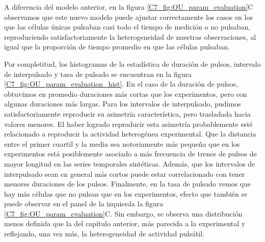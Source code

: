 \documentclass[./main.tex]{subfiles}
\begin{document}
A diferencia del modelo anterior, en la figura \ref{C7_fig:OU_param_evaluation}C observamos que este nuevo modelo puede ajustar correctamente los casos en los que las células únicas pulsaban casi todo el tiempo de medición o no pulsaban, reproduciendo satisfactoriamente la heterogeneidad de nuestras observaciones, al igual que la proporción de tiempo promedio en que las células pulsaban.


Por completitud, los histogramas de la estadística de duración de pulsos, intervalo de interpulsado y tasa de pulsado se encuentran en la figura \ref{C7_fig:OU_param_evaluation_hist}. En el caso de la duración de pulsos, obtuvimos en promedio duraciones más cortas que los experimentos, pero con algunas duraciones más largas. Para los intervalos de interpulsado, pudimos satisfactoriamente reproducir su asimetría característica, pero trasladada hacia valores menores. El haber logrado reproducir esta asimetría probablemente esté relacionado a reproducir la actividad heterogénea experimental. Que la distancia entre el primer cuartil y la media sea notoriamente más pequeña que en los experimentos está posiblemente asociado a más frecuencia de trenes de pulsos de mayor longitud en las series temporales sintéticas. Además, que los intervalos de interpulsado sean en general más cortos puede estar correlacionado con tener menores duraciones de los pulsos. Finalmente, en la tasa de pulsado vemos que hay más células que no pulsan que en los experimentos, efecto que también se puede observar en el panel de la izquierda la figura \ref{C7_fig:OU_param_evaluation}C. Sin embargo, se observa una distribución menos definida que la del capítulo anterior, más parecida a la experimental y reflejando, una vez más, la heterogeneidad de actividad pulsátil. 
\end{document}
